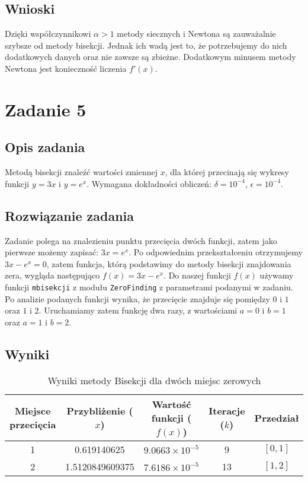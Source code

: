 \documentclass{article}
\begin{document}
\subsection*{Wnioski}
Dzięki współczynnikowi $\alpha>1$ metody siecznych i Newtona są zauważalnie szybsze od metody bisekcji. Jednak ich wadą jest to, że potrzebujemy do nich dodatkowych danych oraz nie zawsze są zbieżne. Dodatkowym minusem metody Newtona jest konieczność liczenia $f'(x)$. 
\section*{Zadanie 5}
\subsection*{Opis zadania}
Metodą bisekcji znaleźć wartości zmiennej $x$, dla której przecinają się wykresy funkcji $y = 3x$ i $y = e^x$. Wymagana dokładności obliczeń: $\delta = 10^{-4}$, $\epsilon= 10^{-4}$.
\subsection*{Rozwiązanie zadania}
Zadanie polega na znalezieniu punktu przecięcia dwóch funkcji, zatem jako pierwsze możemy zapisać: $3x=e^x$. Po odpowiednim przekształceniu otrzymujemy $3x-e^x=0$, zatem funkcja, którą podstawimy do metody bisekcji znajdowania zera, wygląda następująco $f(x)=3x-e^x$. Do naszej funkcji $f(x)$ używamy funkcji \texttt{mbisekcji} z modułu \texttt{ZeroFinding}  z parametrami podanymi w zadaniu. Po analizie podanych funkcji wynika, że przecięcie znajduje się pomiędzy $0$ i $1$ oraz $1$ i $2$. Uruchamiamy zatem funkcję dwa razy, z wartościami $a=0$ i $b=1$ oraz $a=1$ i $b=2$.  
\subsection*{Wyniki }
\begin{table}[h!]
\centering
\begin{tabular}{|c|c|c|c|c|}
\hline
\textbf{Miejsce przecięcia} & \textbf{Przybliżenie ($x$)} & \textbf{Wartość funkcji ($f(x)$)} & \textbf{Iteracje ($k$)} & \textbf{Przedział} \\ \hline
1        & 0.619140625                & $9.0663 \times 10^{-5}$          & 9                        & $[0,1]$                        \\ \hline
2           & 1.5120849609375            & $7.6186 \times 10^{-5}$          & 13                       & $[1,2]$                        \\ \hline
\end{tabular}
\caption{Wyniki metody Bisekcji dla dwóch miejsc zerowych}
\label{tab:bisekcja_miejsca}
\end{table}
\end{document}
